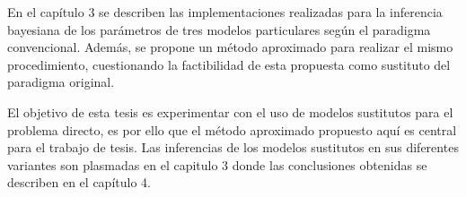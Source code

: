 En el capítulo 3 se describen las implementaciones realizadas para la inferencia bayesiana de los parámetros de tres modelos particulares según el paradigma convencional. Además, se propone un método aproximado para realizar el mismo procedimiento, cuestionando la factibilidad de esta propuesta como sustituto del paradigma original. 

El objetivo de esta tesis es experimentar con el uso de modelos sustitutos para el problema directo, es por ello que el método aproximado propuesto aquí es central para el trabajo de tesis. Las inferencias de los modelos sustitutos en sus diferentes variantes son plasmadas en el capitulo 3 donde las conclusiones obtenidas se describen en el capítulo 4.


































